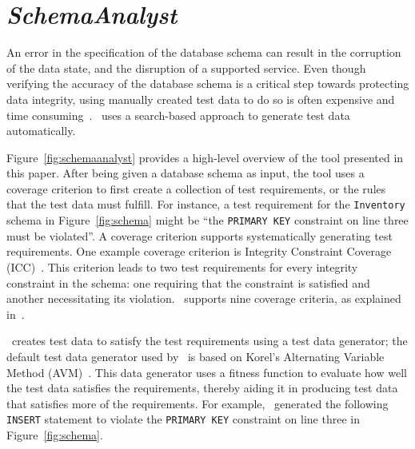 \section{\textit{SchemaAnalyst}}\label{sec:technique}


An error in the specification of the database schema can result in the corruption of the data state, and the disruption
of a supported service.  Even though verifying the accuracy of the database schema is a critical step towards protecting
data integrity, using manually created test data to do so is often expensive and time
consuming~\cite{kapfhammer2013search}.  \sa~uses a search-based approach to generate test data automatically.


Figure~\ref{fig:schemaanalyst} provides a high-level overview of the tool presented in this paper.  After being given a
database schema as input, the tool uses a coverage criterion to first create a collection of test requirements, or the
rules that the test data must fulfill.  For instance, a test requirement for the \texttt{Inventory} schema in
Figure~\ref{fig:schema} might be ``the \texttt{PRIMARY KEY} constraint on line three must be violated''. A coverage
criterion supports systematically generating test requirements.  One example coverage criterion is Integrity Constraint
Coverage (ICC)~\cite{mcminn2015effectiveness}. This criterion leads to two test requirements for every integrity
constraint in the schema: one requiring that the constraint is satisfied and another necessitating its violation.
\sa~supports nine coverage criteria, as explained in~\cite{mcminn2015effectiveness}.


\sa~creates test data to satisfy the test requirements using a test data generator; the default test data generator used
by \sa~is based on Korel's Alternating Variable Method (AVM)~\cite{Korel:AVM}. This data generator uses a fitness
function to evaluate how well the test data satisfies the requirements, thereby aiding it in producing test data that
satisfies more of the requirements. For example, \sa~generated the following \texttt{INSERT} statement to violate the
\texttt{PRIMARY KEY} constraint on line three in Figure~\ref{fig:schema}.

